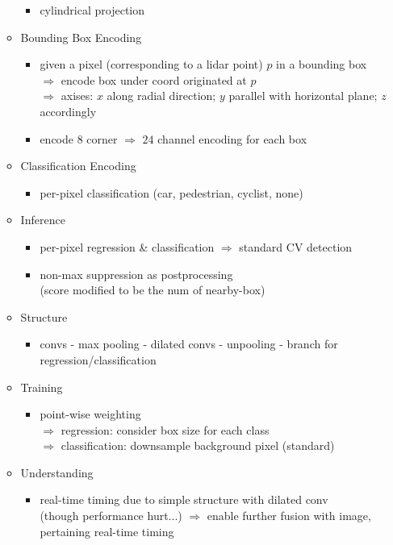 \begin{itemize}
\begin{itemize}
\begin{itemize}
		\item cylindrical projection
		\end{itemize}
	\item Bounding Box Encoding
		\begin{itemize}
		\item given a pixel (corresponding to a lidar point) $p$ in a bounding box \\ 
		$\Rightarrow$ encode box under coord originated at $p$ \\
		$\Rightarrow$ axises: $x$ along radial direction; $y$ parallel with horizontal plane; $z$ accordingly
		\item encode $8$ corner $\Rightarrow$ $24$ channel encoding for each box
		\end{itemize}
	\item Classification Encoding
		\begin{itemize}
		\item per-pixel classification (car, pedestrian, cyclist, none)
		\end{itemize}
	\item Inference
		\begin{itemize}
		\item per-pixel regression \& classification $\Rightarrow$ standard CV detection
		\item non-max suppression as postprocessing\\ 
		(score modified to be the num of nearby-box)
		\end{itemize}
	\item Structure
		\begin{itemize}
		\item convs - max pooling - dilated convs - unpooling - branch for regression/classification
		\end{itemize}
	\item Training
		\begin{itemize}
		\item point-wise weighting \\
		$\Rightarrow$ regression: consider box size for each class \\
		$\Rightarrow$ classification: downsample background pixel (standard)
		\end{itemize}
	\item Understanding
		\begin{itemize}
		\item real-time timing due to simple structure with dilated conv \\
		(though performance hurt...)
		$\Rightarrow$ enable further fusion with image, pertaining real-time timing
		\end{itemize}
	\end{itemize}
\end{itemize}
